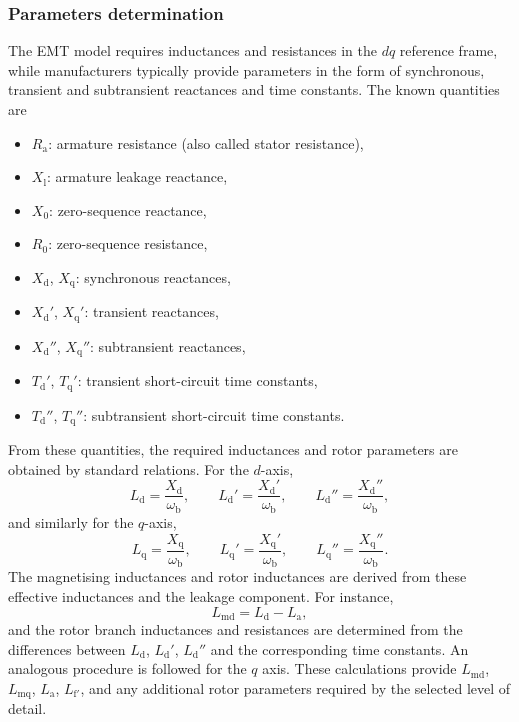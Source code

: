 \subsubsection{Parameters determination}

The EMT model requires inductances and resistances in the $dq$ reference frame, while manufacturers typically 
provide parameters in the form of synchronous, transient and subtransient reactances and time constants. The known quantities are
\begin{itemize}
    \item $R_\text{a}$: armature resistance (also called stator resistance),
    \item $X_\text{l}$: armature leakage reactance,
    \item $X_\text{0}$: zero-sequence reactance,
    \item $R_\text{0}$: zero-sequence resistance,
    \item $X_\text{d}$, $X_\text{q}$: synchronous reactances,
    \item $X_\text{d}'$, $X_\text{q}'$: transient reactances,
    \item $X_\text{d}''$, $X_\text{q}''$: subtransient reactances,
    \item $T_\text{d}'$, $T_\text{q}'$: transient short-circuit time constants,
    \item $T_\text{d}''$, $T_\text{q}''$: subtransient short-circuit time constants.
\end{itemize}

From these quantities, the required inductances and rotor parameters are obtained by standard relations. For the $d$-axis,
\begin{equation}
    L_\text{d} = \frac{X_\text{d}}{\omega_\text{b}}, \qquad
    L_\text{d}' = \frac{X_\text{d}'}{\omega_\text{b}}, \qquad
    L_\text{d}'' = \frac{X_\text{d}''}{\omega_\text{b}},
\end{equation}
and similarly for the $q$-axis,
\begin{equation}
    L_\text{q} = \frac{X_\text{q}}{\omega_\text{b}}, \qquad
    L_\text{q}' = \frac{X_\text{q}'}{\omega_\text{b}}, \qquad
    L_\text{q}'' = \frac{X_\text{q}''}{\omega_\text{b}}.
\end{equation}
The magnetising inductances and rotor inductances are derived from these effective inductances and the leakage component. For instance,
\begin{equation}
    L_{\text{md}} = L_\text{d} - L_\text{a},
\end{equation}
and the rotor branch inductances and resistances are determined from the differences between $L_\text{d}$, $L_\text{d}'$, $L_\text{d}''$ 
and the corresponding time constants. An analogous procedure is followed for the $q$ axis. These calculations provide 
$L_{\text{md}}$, $L_{\text{mq}}$, $L_\text{a}$, $L_{\text{f}'}$, and any additional rotor parameters required by the selected level of detail.

